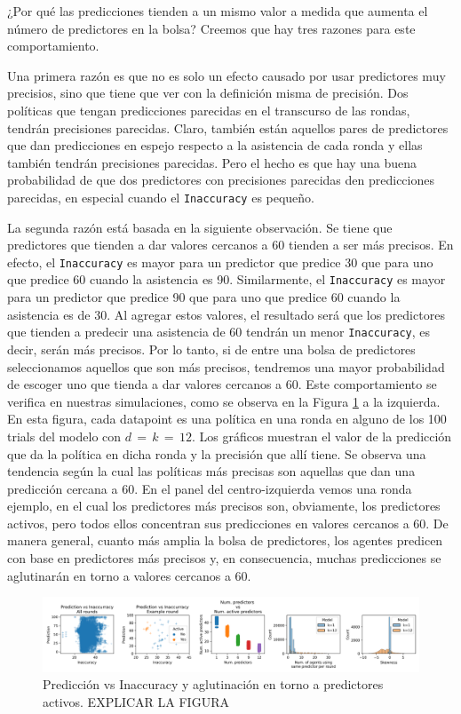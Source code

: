 \documentclass[11pt]{amsart}
\begin{document}
¿Por qué las predicciones tienden a un mismo valor a medida que aumenta el número de predictores en la bolsa? Creemos que hay tres razones para este comportamiento.

Una primera razón es que no es solo un efecto causado por usar predictores muy precisios, sino que tiene que ver con la definición misma de precisión. Dos políticas que tengan predicciones parecidas en el transcurso de las rondas, tendrán precisiones parecidas. Claro, también están aquellos pares de predictores que dan predicciones en espejo respecto a la asistencia de cada ronda y ellas también tendrán precisiones parecidas. Pero el hecho es que hay una buena probabilidad de que dos predictores con precisiones parecidas den predicciones parecidas, en especial cuando el \texttt{Inaccuracy} es pequeño.

La segunda razón está basada en la siguiente observación. Se tiene que predictores que tienden a dar valores cercanos a 60 tienden a ser más precisos. En efecto, el \texttt{Inaccuracy} es mayor para un predictor que predice 30 que para uno que predice 60 cuando la asistencia es 90. Similarmente, el \texttt{Inaccuracy}  es mayor para un predictor que predice 90 que para uno que predice 60 cuando la asistencia es de 30. Al agregar estos valores, el resultado será que los predictores que tienden a predecir una asistencia de 60 tendrán un menor \texttt{Inaccuracy}, es decir, serán más precisos. Por lo tanto, si de entre una bolsa de predictores seleccionamos aquellos que son más precisos, tendremos una mayor probabilidad de escoger uno que tienda a dar valores cercanos a 60. Este comportamiento se verifica en nuestras simulaciones, como se observa en la Figura \ref{fig:bump} a la izquierda. En esta figura, cada datapoint es una política en una ronda en alguno de los 100 trials del modelo con $d\,{=}\,k\,{=}\,12$. Los gráficos muestran el valor de la predicción que da la política en dicha ronda y la precisión que allí tiene. Se observa una tendencia según la cual las políticas más precisas son aquellas que dan una predicción cercana a 60. En el panel del centro-izquierda vemos una ronda ejemplo, en el cual los predictores más precisos son, obviamente, los predictores activos, pero todos ellos concentran sus predicciones en valores cercanos a 60. De manera general, cuanto más amplia la bolsa de predictores, los agentes predicen con base en predictores más precisos y, en consecuencia, muchas predicciones se aglutinarán en torno a valores cercanos a 60.

\begin{figure}
\begin{center}
\includegraphics[width=.9\linewidth]{./Figuras/Figura4.png}
\caption{Predicción vs Inaccuracy y  aglutinación en torno a predictores activos. EXPLICAR LA FIGURA}\label{fig:bump}
\end{center}
\end{figure}
\end{document}
